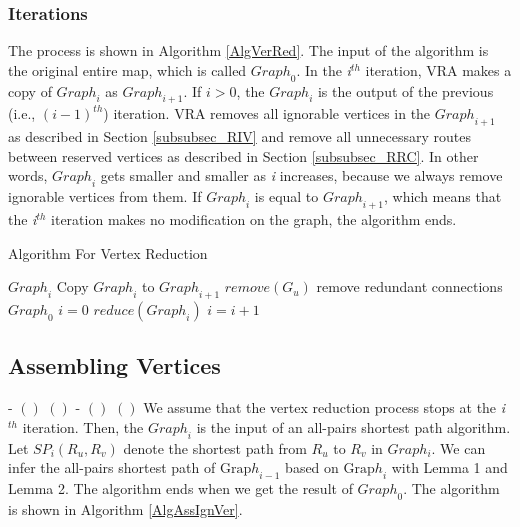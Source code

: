 \subsubsection{ Iterations}

The process is shown in Algorithm \ref{AlgVerRed}. The input of the algorithm is the original entire map, which is called ${Graph}_0$. In the \textit{i}${}^{th}$ iteration, VRA makes a copy of ${Graph}_i$ as ${Graph}_{i+1}$. If $i>0$, the ${Graph}_i$ is the output of the previous (i.e., ${\left(i-1\right)}^{th}$) iteration. VRA removes all ignorable vertices in the ${Graph}_{i+1}$ as described in Section \ref{subsubsec_RIV} and remove all unnecessary routes between reserved vertices as described in Section \ref{subsubsec_RRC}. In other words, ${Graph}_i$ gets smaller and smaller as \textit{i} increases, because we always remove ignorable vertices from them. If ${Graph}_i$ is equal to ${Graph}_{i+1}$, which means that the \textit{i}${}^{th}$ iteration makes no modification on the graph, the algorithm ends.

\begin{algorithm} [hbtp]
\caption{Algorithm For Vertex Reduction}\label{AlgVerRed}
\begin{algorithmic}[1]
 {${Graph}_i$}
\State Copy ${Graph}_i$ to ${Graph}_{i+1}$
	\State $remove(G_u)$
\EndFor
{}
	\State remove redundant connections
\EndFor
\EndProcedure
{} {${Graph}_0$}
\State $i=0$
	\State $reduce({Graph}_i)$
	\State $i=i+1$
\EndWhile
\EndProcedure
\end{algorithmic}
\end{algorithm}

\subsection{ Assembling Vertices}

\noindent - $\left(\right)$                                       $\left(\right)$      - $\left(\right)$                                       $\left(\right)$      We assume that the vertex reduction process stops at the \textit{i}${}^{th}$ iteration. Then, the ${Graph}_i$ is the input of an all-pairs shortest path algorithm. Let $SP_i\left(R_u,R_v\right)$ denote the shortest path from $R_u$ to $R_v$ in $Graph_i$. We can infer the all-pairs shortest path of ${\mathrm{Grap}h}_{i-1}$ based on ${\mathrm{Grap}h}_i$ with Lemma 1 and Lemma 2. The algorithm ends when we get the result of ${Graph}_0$. The algorithm is shown in Algorithm \ref{AlgAssIgnVer}.

